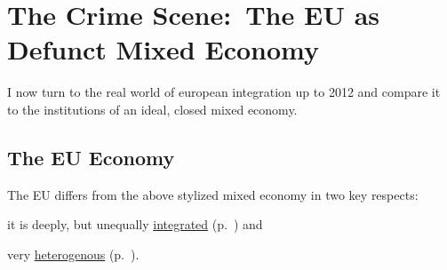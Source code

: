 


\section{The Crime Scene:\ The EU as Defunct Mixed Economy}
	\label{sec:EU-reality}
I now turn to the real world of european integration up to 2012 and compare it to the institutions of an ideal, closed mixed economy.

\subsection{The EU Economy}
The \gls{EU} differs from the above stylized mixed economy in two key respects:
\begin{inparaenum}
	\item it is deeply, but unequally \hyperref[sec:EU-Acquis]{integrated} (p.~\pageref{sec:EU-Acquis}) and
	\item very \hyperref[sec:sources-of-wealth]{heterogenous} (p.~\pageref{sec:sources-of-wealth}).
\end{inparaenum}


